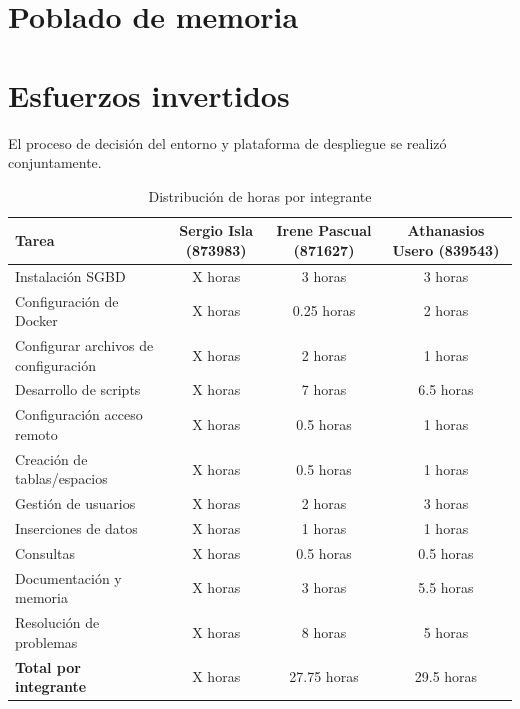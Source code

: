\documentclass{article}
\begin{document}
\section{Poblado de memoria}\label{sec:Poblado de memoria}



\section{Esfuerzos invertidos}\label{sec:Esfuerzos invertidos}

El proceso de decisión del entorno y plataforma de despliegue se realizó conjuntamente. 

\begin{table}[H]
    \centering
    \caption{Distribución de horas por integrante}
    \label{tab:esfuerzos}
    \begin{tabular}{|l|c|c|c|}
    \hline
    \textbf{Tarea} & \textbf{Sergio Isla (873983)} & \textbf{Irene Pascual (871627)} & \textbf{Athanasios Usero (839543)} \\ \hline
    Instalación SGBD & X horas & 3 horas & 3 horas \\ \hline
    Configuración de Docker & X horas & 0.25 horas & 2 horas \\ \hline
    Configurar archivos de configuración & X horas & 2 horas & 1 horas \\ \hline
    Desarrollo de scripts & X horas & 7 horas & 6.5 horas \\ \hline
    Configuración acceso remoto & X horas & 0.5 horas & 1 horas \\ \hline
    Creación de tablas/espacios & X horas & 0.5 horas & 1 horas \\ \hline
    Gestión de usuarios & X horas & 2 horas & 3 horas \\ \hline
    Inserciones de datos & X horas & 1 horas & 1 horas \\ \hline
    Consultas & X horas & 0.5 horas & 0.5 horas \\ \hline
    Documentación y memoria & X horas & 3 horas & 5.5 horas \\ \hline
    Resolución de problemas & X horas & 8 horas & 5 horas \\ \hline \hline
    \textbf{Total por integrante} & X horas & 27.75 horas & 29.5 horas \\ \hline
    \end{tabular}
    \end{table}
    
\newpage
\end{document}
